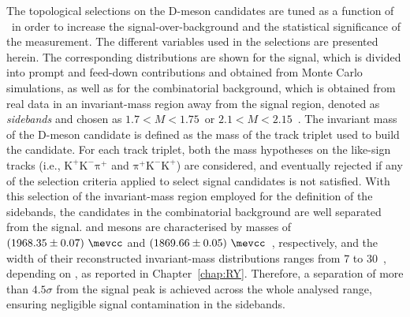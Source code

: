 The topological selections on the D-meson candidates are tuned as a function of \pt\ in order to increase the signal-over-background and the statistical significance of the measurement. The different variables used in the selections are presented herein. The corresponding distributions are shown for the signal, which is divided into prompt and feed-down contributions and obtained from Monte Carlo simulations, as well as for the combinatorial background, which is obtained from real data in an invariant-mass region away from the signal region, denoted as \emph{sidebands} and chosen as $1.7<M<1.75$~\gevcc or $2.1<M<2.15$~\gevcc. The invariant mass of the D-meson candidate is defined as the mass of the track triplet used to build the candidate. For each track triplet, both the mass hypotheses on the like-sign tracks (i.e., $\mathrm{K^+K^-\pi^+}$ and $\mathrm{\pi^+K^-K^+}$) are considered, and eventually rejected if any of the selection criteria applied to select signal candidates is not satisfied. With this selection of the invariant-mass region employed for the definition of the sidebands, the candidates in the combinatorial background are well separated from the signal. \ds and \dpl mesons are characterised by masses of $(1968.35\pm0.07)~\mevcc$ and $(1869.66\pm0.05)~\mevcc$~\cite{pdg}, respectively, and the width of their reconstructed invariant-mass distributions ranges from 7 to 30~\mevcc, depending on \pt, as reported in Chapter~\ref{chap:RY}. Therefore, a separation of more than $4.5\sigma$ from the signal peak is achieved across the whole analysed \pt range, ensuring negligible signal contamination in the sidebands.

